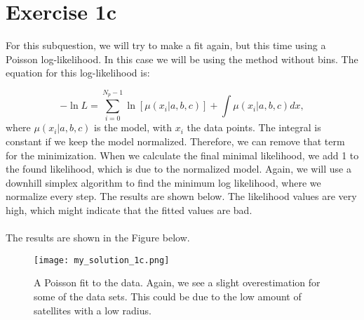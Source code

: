 \section{Exercise 1c}

For this subquestion, we will try to make a fit again, but this time using a Poisson log-likelihood. In this case we will be using the method without bins. The equation for this log-likelihood is: 

\begin{equation}
    -\ln{L} = \sum^{N_p-1}_{i = 0} \ln{[\mu(x_i|a,b,c)] + \int \mu(x_i|a,b,c) dx}, 
\end{equation}
where $\mu(x_i|a,b,c)$ is the model, with $x_i$ the data points. The integral is constant if we keep the model normalized. Therefore, we can remove that term for the minimization. When we calculate the final minimal likelihood, we add 1 to the found likelihood, which is due to the normalized model. Again, we will use a downhill simplex algorithm to find the minimum log likelihood, where we normalize every step. The results are shown below. The likelihood values are very high, which might indicate that the fitted values are bad. 
\\
\\



The results are shown in the Figure below.

\begin{figure}[h!]
  \centering
  \texttt{[image: my\_solution\_1c.png]}
  \caption{A Poisson fit to the data. Again, we see a slight overestimation for some of the data sets. This could be due to the low amount of satellites with a low radius.}
\end{figure}
